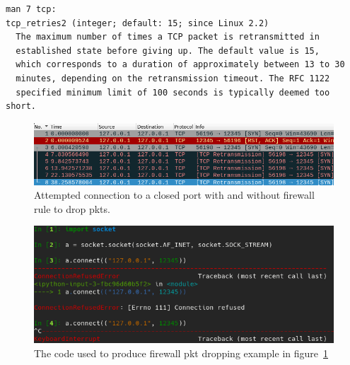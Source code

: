 \documentclass[titlepage]{article}
\begin{document}
\begin{verbatim}
man 7 tcp:
tcp_retries2 (integer; default: 15; since Linux 2.2)
  The maximum number of times a TCP packet is retransmitted in
  established state before giving up. The default value is 15,
  which corresponds to a duration of approximately between 13 to 30
  minutes, depending on the retransmission timeout. The RFC 1122
  specified minimum limit of 100 seconds is typically deemed too short.
\end{verbatim}

\begin{figure}[H]
  \centering
  \includegraphics[width=\textwidth]{screenshots/packet_drop.png}
  \caption{%
    Attempted connection to a closed port with and without firewall rule to drop \glspl{pkt}.
  }\label{firewall}
\end{figure}

\begin{figure}[H]
  \centering
  \includegraphics[width=\textwidth]{screenshots/packet_drop_code.png}
  \caption{%
    The code used to produce firewall \gls{pkt} dropping example in figure~\ref{firewall}
  }\label{firewall_code}
\end{figure}
\end{document}
